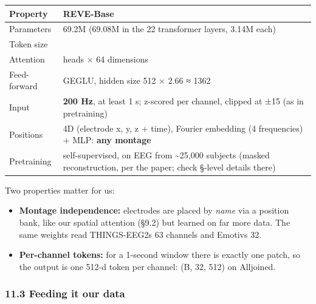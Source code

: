 \documentclass[
  11pt,
]{article}
\newcounter{none} %
\providecommand{\tightlist}{%
  \setlength{\itemsep}{0pt}\setlength{\parskip}{0pt}}
\renewcommand{\_}{\oldunderscore\allowbreak}
\begin{document}
{\def\LTcaptype{none} %
\begin{longtable}[]{@{}
  >{\raggedright\arraybackslash}p{}
  >{\raggedright\arraybackslash}p{}@{}}
\toprule\noalign{}
\begin{minipage}[b]{\linewidth}\raggedright
Property
\end{minipage} &
\begin{minipage}[b]{\linewidth}\raggedright
REVE-Base
\end{minipage} \\
\midrule\noalign{}
\endhead
\bottomrule\noalign{}
\endlastfoot
Parameters & 69.2M (69.08M in the 22
transformer layers, 3.14M each) \\
Token size & 512 \\
Attention & 8 heads × 64 dimensions \\
Feed-forward & GEGLU, hidden size 512 ×
2.66 ≈ 1362 \\
Input & \textbf{200 Hz}, at least 1 s;
z-scored per channel, clipped at ±15 (as
in pretraining) \\
Positions & 4D (electrode x, y, z +
time), Fourier embedding (4 frequencies)
+ MLP: \textbf{any montage} \\
Pretraining & self-supervised, on EEG
from \textasciitilde25,000 subjects
(masked reconstruction, per the paper;
check §-level details there) \\
\end{longtable}
}

Two properties matter for us:

\begin{itemize}
\tightlist
\item
  \textbf{Montage independence:}
  electrodes are placed by \emph{name}
  via a position bank, like our spatial
  attention (§9.2) but learned on far
  more data. The same weights read
  THINGS-EEG2\textquotesingle s 63
  channels and Emotiv\textquotesingle s
  32.
\item
  \textbf{Per-channel tokens:} for a
  1-second window there is exactly one
  patch, so the output is one 512-d
  token per channel: (B, 32, 512) on
  Alljoined.
\end{itemize}

\subsubsection{11.3 Feeding it our
data}\label{feeding-it-our-data}
\end{document}
